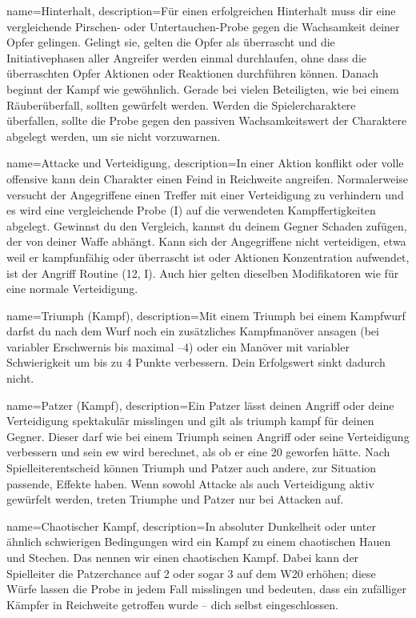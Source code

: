         
{
    name={Hinterhalt},
description={Für einen erfolgreichen Hinterhalt muss dir eine vergleichende Pirschen- oder Untertauchen-Probe gegen die Wachsamkeit deiner Opfer gelingen. Gelingt sie, gelten die Opfer als überrascht und die Initiativephasen aller Angreifer werden einmal durchlaufen, ohne dass die überraschten Opfer Aktionen oder Reaktionen durchführen können. Danach beginnt der Kampf wie gewöhnlich. Gerade bei vielen Beteiligten, wie bei einem Räuberüberfall, sollten  gewürfelt werden. Werden die Spielercharaktere überfallen, sollte die Probe gegen den passiven Wachsamkeitswert der Charaktere abgelegt werden, um sie nicht vorzuwarnen.}}

{
    name={Attacke und Verteidigung},
    description={In einer Aktion \gls{konflikt} oder \gls{volle offensive} kann dein Charakter einen Feind in Reichweite angreifen. Normalerweise versucht der Angegriffene einen Treffer mit einer Verteidigung zu verhindern und es wird eine vergleichende Probe (I) auf die verwendeten Kampffertigkeiten abgelegt. Gewinnst du den Vergleich, kannst du deinem Gegner Schaden zufügen, der von deiner Waffe abhängt. Kann sich der Angegriffene nicht verteidigen, etwa weil er kampfunfähig oder überrascht ist oder Aktionen Konzentration aufwendet, ist der Angriff Routine (12, I). Auch hier gelten dieselben Modifikatoren wie für eine normale Verteidigung.}}

{
    name={Triumph (Kampf)},
    description={Mit einem Triumph bei einem Kampfwurf darfst du nach dem Wurf noch ein zusätzliches Kampfmanöver ansagen (bei variabler Erschwernis bis maximal –4) oder ein Manöver mit variabler Schwierigkeit um bis zu 4 Punkte verbessern. Dein Erfolgswert sinkt dadurch nicht.}}

{
    name={Patzer (Kampf)},
    description={Ein Patzer lässt deinen Angriff oder deine Verteidigung spektakulär misslingen und gilt als \gls{triumph kampf} für deinen Gegner. Dieser darf wie bei einem Triumph seinen Angriff oder seine Verteidigung verbessern und sein \gls{ew} wird berechnet, als ob er eine 20 geworfen hätte. Nach Spielleiterentscheid können Triumph und Patzer auch andere, zur Situation passende, Effekte haben. Wenn sowohl Attacke als auch Verteidigung aktiv gewürfelt werden, treten Triumphe und Patzer nur bei Attacken auf.}}

{
    name={Chaotischer Kampf},
    description={In absoluter Dunkelheit oder unter ähnlich schwierigen Bedingungen wird ein Kampf zu einem chaotischen Hauen und Stechen. Das nennen wir einen chaotischen Kampf. Dabei kann der Spielleiter die Patzerchance auf 2 oder sogar 3 auf dem W20 erhöhen; diese Würfe lassen die Probe in jedem Fall misslingen und bedeuten, dass ein zufälliger Kämpfer in Reichweite getroffen wurde – dich selbst eingeschlossen.}}

